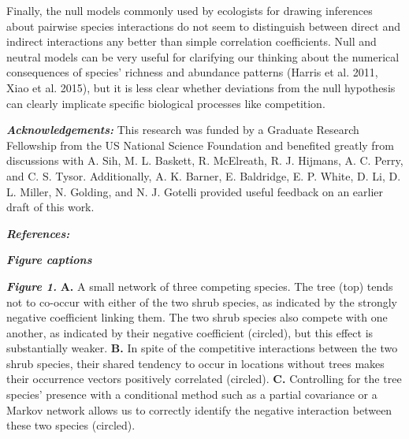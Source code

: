 \documentclass[12pt,]{article}
\begin{document}
\begin{spacing}{1.9}
\begin{flushleft}
Finally, the null models commonly used by ecologists for drawing
inferences about pairwise species interactions do not seem to
distinguish between direct and indirect interactions any better than
simple correlation coefficients. Null and neutral models can be very
useful for clarifying our thinking about the numerical consequences of
species' richness and abundance patterns (Harris et al. 2011, Xiao et
al. 2015), but it is less clear whether deviations from the null
hypothesis can clearly implicate specific biological processes like
competition.

\textbf{\emph{Acknowledgements:}} This research was funded by a Graduate
Research Fellowship from the US National Science Foundation and
benefited greatly from discussions with A. Sih, M. L. Baskett, R.
McElreath, R. J. Hijmans, A. C. Perry, and C. S. Tysor. Additionally, A.
K. Barner, E. Baldridge, E. P. White, D. Li, D. L. Miller, N. Golding,
and N. J. Gotelli provided useful feedback on an earlier draft of this
work.

\textbf{\emph{References:}}

\textbf{\emph{Figure captions}}

\textbf{\emph{Figure 1.}} \textbf{A.} A small network of three competing
species. The tree (top) tends not to co-occur with either of the two
shrub species, as indicated by the strongly negative coefficient linking
them. The two shrub species also compete with one another, as indicated
by their negative coefficient (circled), but this effect is
substantially weaker. \textbf{B.} In spite of the competitive
interactions between the two shrub species, their shared tendency to
occur in locations without trees makes their occurrence vectors
positively correlated (circled). \textbf{C.} Controlling for the tree
species' presence with a conditional method such as a partial covariance
or a Markov network allows us to correctly identify the negative
interaction between these two species (circled).


\end{flushleft}
\end{spacing}
\end{document}
